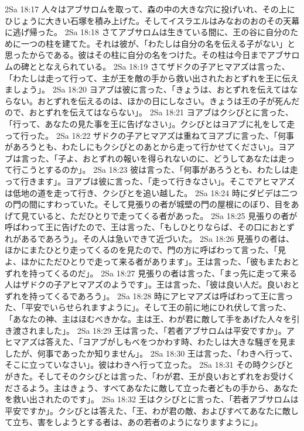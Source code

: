 2Sa 18:17  人々はアブサロムを取って、森の中の大きな穴に投げいれ、その上にひじょうに大きい石塚を積み上げた。そしてイスラエルはみなおのおのその天幕に逃げ帰った。
2Sa 18:18  さてアブサロムは生きている間に、王の谷に自分のために一つの柱を建てた。それは彼が、「わたしは自分の名を伝える子がない」と思ったからである。彼はその柱に自分の名をつけた。その柱は今日までアブサロムの碑ととなえられている。
2Sa 18:19  さてザドクの子アヒマアズは言った、「わたしは走って行って、主が王を敵の手から救い出されたおとずれを王に伝えましょう」。
2Sa 18:20  ヨアブは彼に言った、「きょうは、おとずれを伝えてはならない。おとずれを伝えるのは、ほかの日にしなさい。きょうは王の子が死んだので、おとずれを伝えてはならない」。
2Sa 18:21  ヨアブはクシびとに言った、「行って、あなたの見た事を王に告げなさい」。クシびとはヨアブに礼をして走って行った。
2Sa 18:22  ザドクの子アヒマアズは重ねてヨアブに言った、「何事があろうとも、わたしにもクシびとのあとから走って行かせてください」。ヨアブは言った、「子よ、おとずれの報いを得られないのに、どうしてあなたは走って行こうとするのか」。
2Sa 18:23  彼は言った、「何事があろうとも、わたしは走って行きます」。ヨアブは彼に言った、「走って行きなさい」。そこでアヒマアズは低地の道を走って行き、クシびとを追い越した。
2Sa 18:24  時にダビデは二つの門の間にすわっていた。そして見張りの者が城壁の門の屋根にのぼり、目をあげて見ていると、ただひとりで走ってくる者があった。
2Sa 18:25  見張りの者が呼ばわって王に告げたので、王は言った、「もしひとりならば、その口におとずれがあるであろう」。その人は急いできて近づいた。
2Sa 18:26  見張りの者は、ほかにまたひとり走ってくるのを見たので、門の方に呼ばわって言った、「見よ、ほかにただひとりで走って来る者があります」。王は言った、「彼もまたおとずれを持ってくるのだ」。
2Sa 18:27  見張りの者は言った、「まっ先に走って来る人はザドクの子アヒマアズのようです」。王は言った、「彼は良い人だ。良いおとずれを持ってくるであろう」。
2Sa 18:28  時にアヒマアズは呼ばわって王に言った、「平安でいらせられますように」。そして王の前に地にひれ伏して言った、「あなたの神、主はほむべきかな。主は王、わが君に敵して手をあげた人々を引き渡されました」。
2Sa 18:29  王は言った、「若者アブサロムは平安ですか」。アヒマアズは答えた、「ヨアブがしもべをつかわす時、わたしは大きな騒ぎを見ましたが、何事であったか知りません」。
2Sa 18:30  王は言った、「わきへ行って、そこに立っていなさい」。彼はわきへ行って立った。
2Sa 18:31  その時クシびとがきた。そしてそのクシびとは言った、「わが君、王が良いおとずれをお受けくださるよう。主はきょう、すべてあなたに敵して立った者どもの手から、あなたを救い出されたのです」。
2Sa 18:32  王はクシびとに言った、「若者アブサロムは平安ですか」。クシびとは答えた、「王、わが君の敵、およびすべてあなたに敵して立ち、害をしようとする者は、あの若者のようになりますように」。

